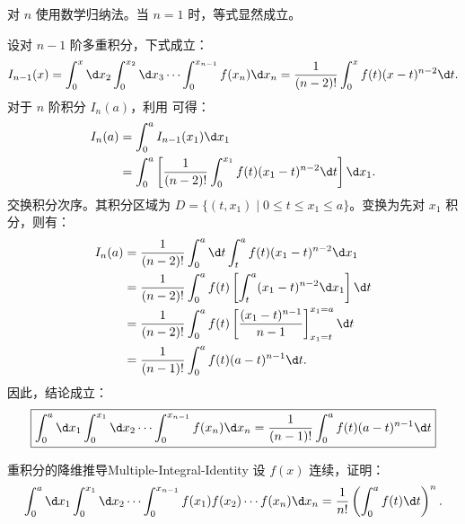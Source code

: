 \begin{myproof}
    对 $n$ 使用数学归纳法。当 $n=1$ 时，等式显然成立。

    设对 $n-1$ 阶多重积分，下式成立：
    \begin{equation}
        \label{eq:Induction-Hypothesis}
        I_{n-1}(x) = \int_{0}^{x} \d x_2 \int_{0}^{x_2} \d x_3 \cdots \int_{0}^{x_{n-1}} f(x_n) \d x_n = \frac{1}{(n-2)!} \int_{0}^{x} f(t)(x-t)^{n-2} \d t.
    \end{equation}
    对于 $n$ 阶积分 $I_n(a)$，利用  可得：
    \begin{equation}
        \begin{aligned}
            I_n(a) & = \int_{0}^{a} I_{n-1}(x_1) \d x_1                                                           \\
                   & = \int_{0}^{a} \left[ \frac{1}{(n-2)!} \int_{0}^{x_1} f(t)(x_1-t)^{n-2} \d t \right] \d x_1.
        \end{aligned}
    \end{equation}
    交换积分次序。其积分区域为 $D = \{ (t, x_1) \mid 0 \le t \le x_1 \le a \}$。变换为先对 $x_1$ 积分，则有：
    \begin{equation}
        \begin{aligned}
            I_n(a) & = \frac{1}{(n-2)!} \int_{0}^{a} \d t \int_{t}^{a} f(t)(x_1-t)^{n-2} \d x_1                         \\
                   & = \frac{1}{(n-2)!} \int_{0}^{a} f(t) \left[ \int_{t}^{a} (x_1-t)^{n-2} \d x_1 \right] \d t         \\
                   & = \frac{1}{(n-2)!} \int_{0}^{a} f(t) \left[ \frac{(x_1-t)^{n-1}}{n-1} \right]_{x_1=t}^{x_1=a} \d t \\
                   & = \frac{1}{(n-1)!} \int_{0}^{a} f(t)(a-t)^{n-1} \d t.
        \end{aligned}
    \end{equation}
    因此，结论成立：
    \begin{equation}
        \boxed{ \int_{0}^{a} \d x_1 \int_{0}^{x_1} \d x_2 \cdots \int_{0}^{x_{n-1}} f(x_n) \d x_n = \frac{1}{(n-1)!} \int_{0}^{a} f(t)(a-t)^{n-1} \d t }
    \end{equation}
\end{myproof}

\begin{problem}{重积分的降维推导}{Multiple-Integral-Identity}
    设 $f(x)$ 连续，证明：
    \begin{equation}
        \int_{0}^{a} \d x_{1} \int_{0}^{x_{1}} \d x_{2} \cdots \int_{0}^{x_{n-1}} f(x_{1}) f(x_{2}) \cdots f(x_{n}) \d x_{n} = \frac{1}{n!} \left( \int_{0}^{a} f(t) \d t \right)^{n}.
    \end{equation}
\end{problem}

